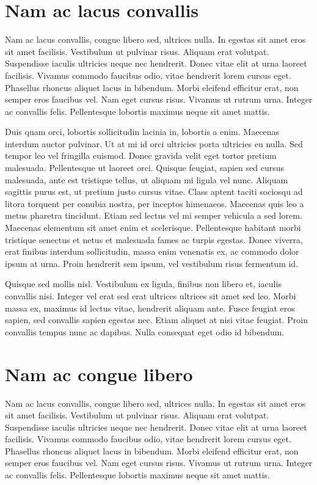 \documentclass[a4paper,10pt]{report}
\begin{document}
\section{Nam ac lacus convallis}

Nam ac lacus convallis, congue libero sed, ultrices nulla. In egestas sit amet eros sit amet facilisis.
Vestibulum ut pulvinar risus. Aliquam erat volutpat. Suspendisse iaculis ultricies neque nec hendrerit.
Donec vitae elit at urna laoreet facilisis. Vivamus commodo faucibus odio, vitae hendrerit lorem cursus eget.
Phasellus rhoncus aliquet lacus in bibendum. Morbi eleifend efficitur erat, non semper eros faucibus vel.
Nam eget cursus risus. Vivamus ut rutrum urna. Integer ac convallis felis.
Pellentesque lobortis maximus neque sit amet mattis.

Duis quam orci, lobortis sollicitudin lacinia in, lobortis a enim. Maecenas interdum auctor pulvinar.
Ut at mi id orci ultricies porta ultricies eu nulla. Sed tempor leo vel fringilla euismod. Donec gravida velit
eget tortor pretium malesuada. Pellentesque ut laoreet orci. Quisque feugiat, sapien sed cursus malesuada,
ante est tristique tellus, ut aliquam mi ligula vel nunc. Aliquam sagittis purus est, ut pretium justo cursus vitae.
Class aptent taciti sociosqu ad litora torquent per conubia nostra, per inceptos himenaeos.
Maecenas quis leo a metus pharetra tincidunt. Etiam sed lectus vel mi semper vehicula a sed lorem.
Maecenas elementum sit amet enim et scelerisque.
Pellentesque habitant morbi tristique senectus et netus et malesuada fames ac turpis egestas.
Donec viverra, erat finibus interdum sollicitudin, massa enim venenatis ex, ac commodo dolor ipsum at urna.
Proin hendrerit sem ipsum, vel vestibulum risus fermentum id.

Quisque sed mollis nisl. Vestibulum ex ligula, finibus non libero et, iaculis convallis nisi.
Integer vel erat sed erat ultrices ultrices sit amet sed leo. Morbi massa ex, maximus id lectus vitae,
hendrerit aliquam ante. Fusce feugiat eros sapien, sed convallis sapien egestas nec. Etiam aliquet at
nisi vitae feugiat. Proin convallis tempus nunc ac dapibus. Nulla consequat eget odio id bibendum.

\section{Nam ac congue libero}

Nam ac lacus convallis, congue libero sed, ultrices nulla. In egestas sit amet eros sit amet facilisis.
Vestibulum ut pulvinar risus. Aliquam erat volutpat. Suspendisse iaculis ultricies neque nec hendrerit.
Donec vitae elit at urna laoreet facilisis. Vivamus commodo faucibus odio, vitae hendrerit lorem cursus eget.
Phasellus rhoncus aliquet lacus in bibendum. Morbi eleifend efficitur erat, non semper eros faucibus vel.
Nam eget cursus risus. Vivamus ut rutrum urna. Integer ac convallis felis.
Pellentesque lobortis maximus neque sit amet mattis.
\end{document}
